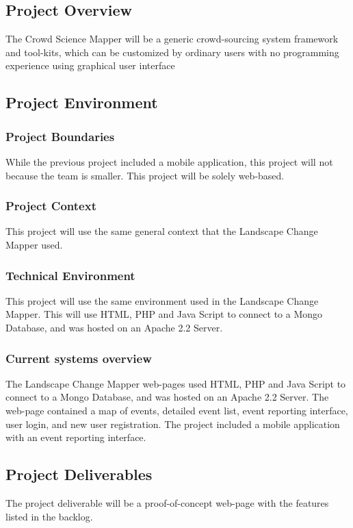 \subsection{Project Overview}
The Crowd Science Mapper will be a generic crowd-sourcing system framework and tool-kits, which can be customized by ordinary users with no programming experience using graphical user interface
\subsection{Project Environment}
\subsubsection{Project Boundaries}
While the previous project included a mobile application, this project will not because the team is smaller. This project will be solely web-based. 
\subsubsection{Project Context}
This project will use the same general context that the Landscape Change Mapper used.  
\subsubsection{Technical Environment}
This project will use the same environment used in the Landscape Change Mapper. This will use HTML, PHP and Java Script to connect to a Mongo Database, and was hosted on an Apache 2.2 Server.
\subsubsection{Current systems overview}
The Landscape Change Mapper web-pages used HTML, PHP and Java Script to connect to a Mongo Database, and was hosted on an Apache 2.2 Server. The web-page contained a map of events, detailed event list, event reporting interface, user login, and new user registration. The project included a mobile application with an event reporting interface. 
\subsection{Project Deliverables}
The project deliverable will be a proof-of-concept web-page with the features listed in the backlog.
